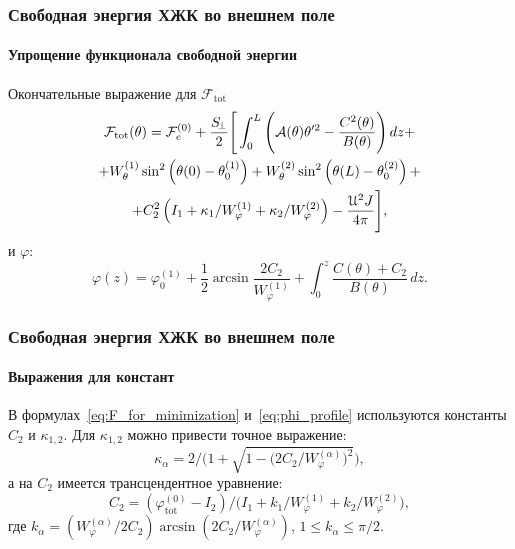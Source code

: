 \documentclass[utf8,secheader]{beamer}
\newcommand{\FF}{\mathcal{F}}
\renewcommand{\AA}{\mathcal{A}}
\renewcommand{\phi}{\varphi}
\begin{document}
\begin{frame}
	\frametitle{Свободная энергия ХЖК во внешнем поле}
	\framesubtitle{Упрощение функционала свободной энергии}
	Окончательные выражение для $\FF_\mathrm{tot}$
	\begin{multline}
		\FF_\mathrm{tot}(\theta) = \FF^{(0)}_e + \frac{S_{\!\bot}}{2}\Bigg[\int_0^L \left({ \AA(\theta)}\theta'^2 - \frac{C^2(\theta)}{B(\theta)} \right) dz +\\
		+W_\theta^{(1)}\sin^2 \left( \theta(0) - \theta_0^{(1)} \right)+W_\theta^{(2)}\sin^2 \left( \theta(L) - \theta_0^{(2)} \right) +\\
		+ C_2^2\left(I_1+{\kappa_1}/{W^{(1)}_\varphi}+{\kappa_2}/{W^{(2)}_\varphi}\right)-{\frac{\EuScript{U}^2 J}{4\pi} }\Bigg],
		\label{eq:F_for_minimization}
	\end{multline}
	и $\phi$:
	\begin{equation}\label{eq:phi_profile}
		\varphi(z)=\varphi_0^{(1)}+\frac12\arcsin\frac{2C_2}{W^{(1)}_\varphi}
		+ \int_0^z \frac{C(\theta)+C_2}{B(\theta)}\, dz .
	\end{equation}
\end{frame}

\begin{frame}
	\frametitle{Свободная энергия ХЖК во внешнем поле}
	\framesubtitle{Выражения для констант}
	В формулах~\eqref{eq:F_for_minimization} и~\eqref{eq:phi_profile} используются константы $C_2$ и $\kappa_{1,2}$. Для $\kappa_{1,2}$ можно привести точное выражение:
	\begin{equation}
		\kappa_\alpha=2/\Big(1+\sqrt{1-\big(2C_2/W^{(\alpha)}_\varphi\big)^2}\Big),
	\end{equation}
	а на $C_2$ имеется трансцендентное уравнение:
	\begin{equation}\label{eq:C2iteration}
		C_2=(\varphi_\mathrm{tot}^{(0)}-I_2)/\big(I_1+k_1/W^{(1)}_\varphi + k_2/W^{(2)}_\varphi \big),
	\end{equation}
	где $k_\alpha=\left(W^{(\alpha)}_\varphi/2C_2\right)\arcsin\left(2C_2/W^{(\alpha)}_\varphi \right)$, $1\leq k_\alpha\leq \pi/2$.
\end{frame}
\end{document}
